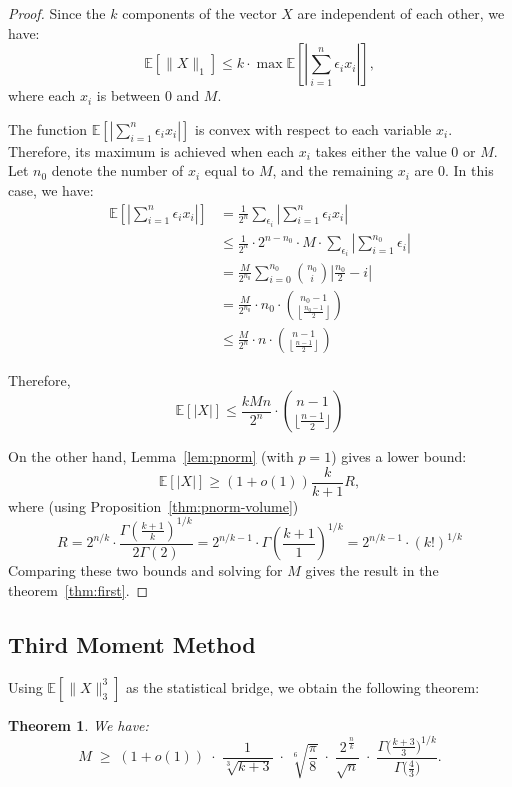 \documentclass[11pt]{amsart}
\theoremstyle{plain}
\newtheorem{theorem}{Theorem}[section]
\theoremstyle{definition}
\numberwithin{equation}{section}
\begin{document}
\begin{proof}
Since the $k$ components of the vector $X$ are independent of each other, we have:
\[
\mathbb{E}[\|X\|_1] \leq k \cdot \max \mathbb{E}\left[\left|\sum_{i=1}^n \epsilon_i x_i\right|\right],
\]
where each $x_i$ is between $0$ and $M$.

The function $\mathbb{E}\left[\left|\sum_{i=1}^n \epsilon_i x_i\right|\right]$ is convex with respect to each variable $x_i$. Therefore, its maximum is achieved when each $x_i$ takes either the value $0$ or $M$. Let $n_0$ denote the number of $x_i$ equal to $M$, and the remaining $x_i$ are $0$. In this case, we have:
\begin{align*}
    \mathbb{E}\left[\left|\sum_{i=1}^n \epsilon_i x_i\right|\right] &= \frac{1}{2^n} \sum_{\epsilon_i} \left|\sum_{i=1}^n \epsilon_i x_i\right| \\
    &\leq \frac{1}{2^n} \cdot 2^{n-n_0} \cdot M \cdot \sum_{\epsilon_i} \left|\sum_{i=1}^{n_0} \epsilon_i\right| \\
    &= \frac{M}{2^{n_0}} \sum_{i=0}^{n_0} \binom{n_0}{i} \left| \frac{n_0}{2} - i \right| \\
    &= \frac{M}{2^{n_0}} \cdot n_0 \cdot \binom{n_0-1}{\left\lfloor \frac{n_0-1}{2} \right\rfloor} \\
    &\leq \frac{M}{2^n} \cdot n \cdot \binom{n-1}{\left\lfloor \frac{n-1}{2} \right\rfloor}
\end{align*}

Therefore,
\begin{equation}
\mathbb{E}[|X|]\le \frac{kMn}{2^n}\cdot \binom{n-1}{\lfloor\frac{n-1}{2}\rfloor}
\end{equation}

On the other hand, Lemma~\ref{lem:pnorm} (with $p=1$) gives a lower bound:
\begin{equation}
\mathbb{E}[|X|] \geq (1+o(1)) \frac{k}{k+1} R,
\end{equation}
where (using Proposition~\ref{thm:pnorm-volume})
\[
R=2^{n/k}\cdot \frac{\Gamma \left(\frac{k+1}{k}\right)^{1/k}}{2\Gamma (2)}=2^{n/k-1}\cdot \Gamma \left(\frac{k+1}{1}\right)^{1/k}=2^{n/k-1}\cdot \left(k!\right)^{1/k}
\]
Comparing these two bounds and solving for $M$ gives the result in the theorem~\ref{thm:first}.
\end{proof}

\subsection{Third Moment Method}
Using $\mathbb{E}[\|X\|_3^3]$ as the statistical bridge, we obtain the following theorem:
\begin{theorem}\label{thm:third}
We have:
\[
M \;\ge\; (1+o(1))\;
\cdot\;\frac{1}{\sqrt[3]{k+3}}
\;\cdot\;\sqrt[6]{\frac{\pi}{8}}
\;\cdot\;\frac{2^{\,\tfrac{n}{k}}}{\sqrt{n}}
\;\cdot\;\frac{\Gamma\!\big(\tfrac{k+3}{3}\big)^{1/k}}{\Gamma\!\big(\tfrac{4}{3}\big)}.
\]
\end{theorem}
\end{document}
